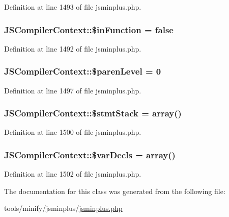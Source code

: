Definition at line 1493 of file jsminplus.\+php.

\hypertarget{classJSCompilerContext_a6f44ab48553406ef9341d80357cc95e2}{
\subsubsection[{\$in\+Function}]{\setlength{\rightskip}{0pt plus 5cm}J\+S\+Compiler\+Context\+::\$in\+Function = false}}\label{classJSCompilerContext_a6f44ab48553406ef9341d80357cc95e2}


Definition at line 1492 of file jsminplus.\+php.

\hypertarget{classJSCompilerContext_a6a20d7b7a0ac24161ff9b414f8275223}{
\subsubsection[{\$paren\+Level}]{\setlength{\rightskip}{0pt plus 5cm}J\+S\+Compiler\+Context\+::\$paren\+Level = 0}}\label{classJSCompilerContext_a6a20d7b7a0ac24161ff9b414f8275223}


Definition at line 1497 of file jsminplus.\+php.

\hypertarget{classJSCompilerContext_a2043060677a2964f657d377dad923ae7}{
\subsubsection[{\$stmt\+Stack}]{\setlength{\rightskip}{0pt plus 5cm}J\+S\+Compiler\+Context\+::\$stmt\+Stack = array()}}\label{classJSCompilerContext_a2043060677a2964f657d377dad923ae7}


Definition at line 1500 of file jsminplus.\+php.

\hypertarget{classJSCompilerContext_a7d936469daab40aea907fbe246e1a1d9}{
\subsubsection[{\$var\+Decls}]{\setlength{\rightskip}{0pt plus 5cm}J\+S\+Compiler\+Context\+::\$var\+Decls = array()}}\label{classJSCompilerContext_a7d936469daab40aea907fbe246e1a1d9}


Definition at line 1502 of file jsminplus.\+php.



The documentation for this class was generated from the following file\+:\begin{DoxyCompactItemize}
\item 
tools/minify/jsminplus/\hyperlink{jsminplus_8php}{jsminplus.\+php}\end{DoxyCompactItemize}
